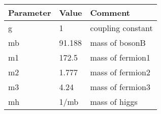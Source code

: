\begin{tabular}{|l|l|l|} \hline
Parameter & Value & Comment \\ \hline
g     &1                   &coupling constant \\
mb    &91.188              &mass of bosonB \\
m1    &172.5               &mass of fermion1 \\
m2    &1.777               &mass of fermion2 \\
m3    &4.24                &mass of fermion3 \\
mh    &1/mb                &mass of higgs \\ \hline
\end{tabular}
